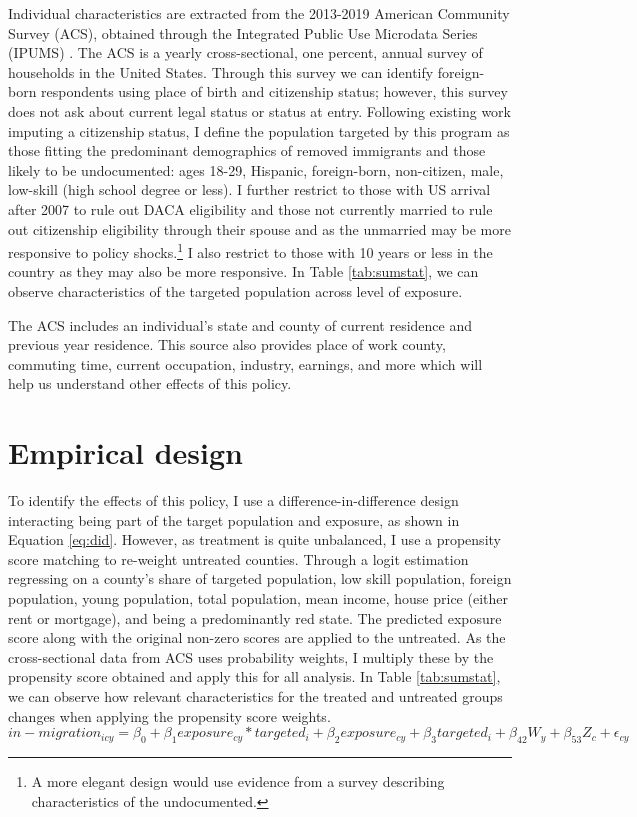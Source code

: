 \documentclass{article}
\begin{document}
Individual characteristics are extracted from the 2013-2019 American Community Survey (ACS), obtained through the Integrated Public Use Microdata Series (IPUMS) \citep{data:acs}. The ACS is a yearly cross-sectional, one percent, annual survey of households in the United States. Through this survey we can identify foreign-born respondents using place of birth and citizenship status; however, this survey does not ask about current legal status or status at entry. Following existing work imputing a citizenship status, I define the population targeted by this program as those fitting the predominant demographics of removed immigrants and those likely to be undocumented: ages 18-29, Hispanic, foreign-born, non-citizen, male, low-skill (high school degree or less). I further restrict to those with US arrival after 2007 to rule out DACA eligibility and those not currently married to rule out citizenship eligibility through their spouse and as the unmarried may be more responsive to policy shocks.\footnote{A more elegant design would use evidence from a survey describing characteristics of the undocumented.} I also restrict to those with 10 years or less in the country as they may also be more responsive. In Table \ref{tab:sumstat}, we can observe characteristics of the targeted population across level of exposure.

The ACS includes an individual's state and county of current residence and previous year residence. This source also provides  place of work county, commuting time, current occupation, industry, earnings, and more which will help us understand other effects of this policy.


\section{Empirical design}
To identify the effects of this policy, I use a difference-in-difference design interacting being part of the target population and exposure, as shown in Equation \ref{eq:did}. However, as treatment is quite unbalanced, I use a propensity score matching to re-weight untreated counties. Through a logit estimation regressing on a county's share of targeted population, low skill population, foreign population, young population, total population, mean income, house price (either rent or mortgage), and being a predominantly red state. The predicted exposure score along with the original non-zero scores are applied to the untreated. 
As the cross-sectional data from ACS uses probability weights, I multiply these by the propensity score obtained and apply this for all analysis. In Table \ref{tab:sumstat}, we can observe how relevant characteristics for the treated and untreated groups changes when applying the propensity score weights.
\begin{equation}
    \label{eq:did}
    in-migration_{icy} = \beta_{0} + \beta_{1}exposure_{cy}*targeted_{i} +  \beta_{2}exposure_{cy} + \beta_{3}targeted_{i} + \beta_{42}W_{y} + \beta_{53}Z_{c} + \epsilon_{cy} 
\end{equation}
\end{document}
